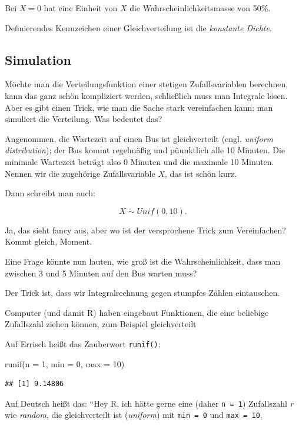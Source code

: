\documentclass[
  a4paper,
  DIV=11]{scrreprt}
\newenvironment{Shaded}{\begin{snugshade}}{\end{snugshade}}
\newcommand{\AttributeTok}[1]{\textcolor[rgb]{0.40,0.45,0.13}{#1}}
\newcommand{\DecValTok}[1]{\textcolor[rgb]{0.68,0.00,0.00}{#1}}
\newcommand{\FunctionTok}[1]{\textcolor[rgb]{0.28,0.35,0.67}{#1}}
\newcommand{\NormalTok}[1]{\textcolor[rgb]{0.00,0.23,0.31}{#1}}
\theoremstyle{definition}
\theoremstyle{remark}
\begin{document}
Bei \(X=0\) hat eine Einheit von \(X\) die Wahrscheinlichkeitsmasse von
50\%.

Definierendes Kennzeichen einer Gleichverteilung ist die \emph{konstante
Dichte}.

\hypertarget{simulation}{%
\subsection{Simulation}\label{simulation}}

Möchte man die Verteilungsfunktion einer stetigen Zufallsvariablen
berechnen, kann das ganz schön kompliziert werden, schließlich muss man
Integrale lösen. Aber es gibt einen Trick, wie man die Sache stark
vereinfachen kann: man simuliert die Verteilung. Was bedeutet das?

Angenommen, die Wartezeit auf einen Bus ist gleichverteilt (engl.
\emph{uniform distribution}); der Bus kommt regelmäßig und püunktlich
alle 10 Minuten. Die minimale Wartezeit beträgt also 0 Minuten und die
maximale 10 Minuten. Nennen wir die zugehörige Zufallsvariable \(X\),
das ist schön kurz.

Dann schreibt man auch:

\[X \sim Unif(0,10).\]

Ja, das sieht fancy aus, aber wo ist der versprochene Trick zum
Vereinfachen? Kommt gleich, Moment.

Eine Frage könnte nun lauten, wie groß ist die Wahrscheinlichkeit, dass
man zwischen 3 und 5 Minuten auf den Bus warten muss?

Der Trick ist, dass wir Integralrechnung gegen stumpfes Zählen
eintauschen.

Computer (und damit R) haben eingebaut Funktionen, die eine beliebige
Zufallszahl ziehen können, zum Beispiel gleichverteilt

Auf Errisch heißt das Zauberwort \texttt{runif()}:

\begin{Shaded}
\begin{Highlighting}[]
\FunctionTok{runif}\NormalTok{(}\AttributeTok{n =} \DecValTok{1}\NormalTok{, }\AttributeTok{min =} \DecValTok{0}\NormalTok{, }\AttributeTok{max =} \DecValTok{10}\NormalTok{)}
\end{Highlighting}
\end{Shaded}

\begin{verbatim}
## [1] 9.14806
\end{verbatim}

Auf Deutsch heißt das: ``Hey R, ich hätte gerne eine (daher
\texttt{n\ =\ 1}) Zufallszahl \emph{r} wie \emph{random}, die
gleichverteilt ist (\emph{uniform}) mit \texttt{min\ =\ 0} und
\texttt{max\ =\ 10}.
\end{document}
